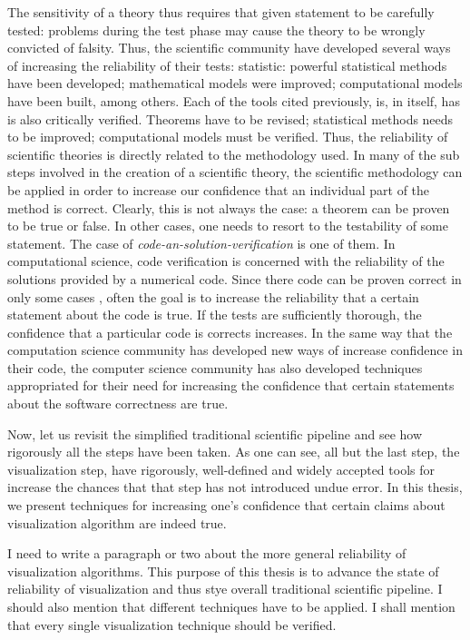 The sensitivity of a theory thus requires that given statement to be carefully tested: problems during the test phase may cause the theory to be wrongly convicted of falsity. Thus, the scientific community have developed several ways of increasing the reliability of their tests: statistic: powerful statistical methods have been developed; mathematical models were improved; computational models have been built, among others.  Each of the tools cited previously, is, in itself, has is also critically verified. Theorems have to be revised; statistical methods needs to be improved; computational models must be verified.  Thus, the reliability of scientific theories is directly related to the methodology used. In many of the sub steps involved in the creation of a scientific theory, the scientific methodology can be applied in order to increase our confidence that an individual part of the method is correct. Clearly, this is not always the case: a theorem can be proven to be true or false. 
In other cases, one needs to resort to the testability of some statement. The case of \emph{code-an-solution-verification} is one of them.  In computational science, code verification is concerned with the reliability of the solutions provided by a numerical code. Since there code can be proven correct in only some cases \cite{citation-needed}, often the goal is to increase the reliability that a certain statement about the code is true. If the tests are sufficiently thorough, the confidence that a particular code is corrects increases. In the same way that the computation science community has developed new ways of increase confidence in their code, the computer science community has also developed techniques appropriated for their need for increasing the confidence that certain statements about the software correctness are true.

Now, let us revisit the simplified traditional scientific pipeline and see how rigorously all the steps have been taken. As one can see, all but the last step, the visualization step, have rigorously, well-defined and widely accepted tools  for increase the chances that that step has not introduced undue error. In this thesis, we present techniques for increasing one's confidence that certain claims about visualization algorithm are indeed true. 

I need to write a paragraph or two about the more general reliability of visualization algorithms. This purpose of this thesis is to advance the state of reliability of visualization and thus stye overall traditional scientific pipeline.
I should also mention that different techniques have to be applied. I shall mention that every single visualization technique should be verified. 


